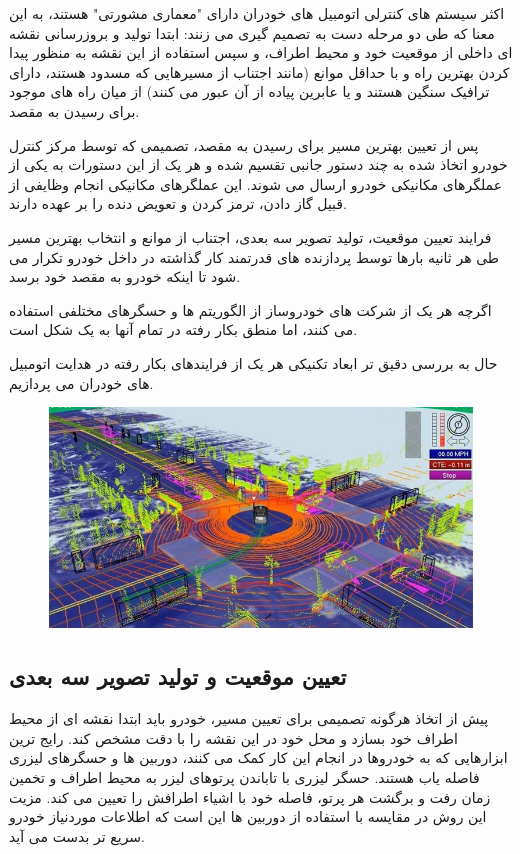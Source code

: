 اکثر سیستم های کنترلی اتومبیل های خودران دارای "معماری مشورتی" هستند، به این معنا که طی دو مرحله دست به تصمیم گیری می زنند: ابتدا تولید و بروزرسانی نقشه ای داخلی از موقعیت خود و محیط اطراف، و سپس استفاده از این نقشه به منظور پیدا کردن بهترین راه و با حداقل موانع (مانند اجتناب از مسیرهایی که مسدود هستند، دارای ترافیک سنگین هستند و یا عابرین پیاده از آن عبور می کنند) از میان راه های موجود برای رسیدن به مقصد.

پس از تعیین بهترین مسیر برای رسیدن به مقصد، تصمیمی که توسط مرکز کنترل خودرو اتخاذ شده به چند دستور جانبی تقسیم شده و هر یک از این دستورات به یکی از عملگرهای مکانیکی خودرو ارسال می شوند. این عملگرهای مکانیکی انجام وظایفی از قبیل گاز دادن، ترمز کردن و تعویض دنده را بر عهده دارند.

فرایند تعیین موقعیت، تولید تصویر سه بعدی، اجتناب از موانع و انتخاب بهترین مسیر طی هر ثانیه بارها توسط پردازنده های قدرتمند کار گذاشته در داخل خودرو تکرار می شود تا اینکه خودرو به مقصد خود برسد.

اگرچه هر یک از شرکت های خودروساز از الگوریتم ها و حسگرهای مختلفی استفاده می کنند، اما منطق بکار رفته در تمام آنها به یک شکل است.

حال به بررسی دقیق تر ابعاد تکنیکی هر یک از فرایندهای بکار رفته در هدایت اتومبیل های خودران می پردازیم.


\begin{figure}
	\centering
	\includegraphics[width=1\linewidth]{Figures/auto-car}
\end{figure}

\subsection{تعیین موقعیت و تولید تصویر سه بعدی}

پیش از اتخاذ هرگونه تصمیمی برای تعیین مسیر، خودرو باید ابتدا نقشه ای از محیط اطراف خود بسازد و محل خود در این نقشه را با دقت مشخص کند. رایج ترین ابزارهایی که به خودروها در انجام این کار کمک می کنند، دوربین ها و حسگرهای لیزری فاصله یاب هستند. حسگر لیزری با تاباندن پرتوهای لیزر به محیط اطراف و تخمین زمان رفت و برگشت هر پرتو، فاصله خود با اشیاء اطرافش را تعیین می کند. مزیت این روش در مقایسه با استفاده از دوربین ها این است که اطلاعات موردنیاز خودرو سریع تر بدست می آید.

